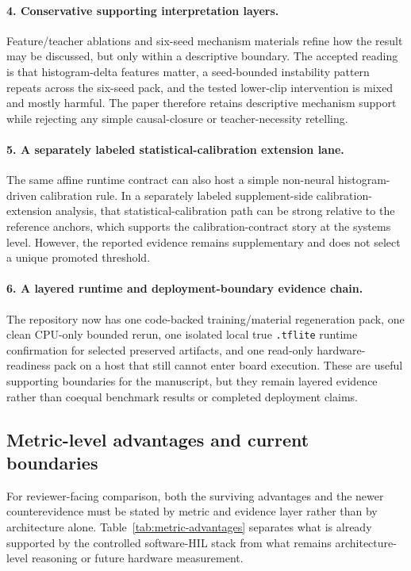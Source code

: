 \documentclass[11pt]{article}
\begin{document}
\paragraph{4. Conservative supporting interpretation layers.}
Feature/teacher ablations and six-seed mechanism materials refine how the
result may be discussed, but only within a descriptive boundary.  The accepted
reading is that histogram-delta features matter, a seed-bounded instability
pattern repeats across the six-seed pack, and the tested lower-clip
intervention is mixed and mostly harmful.  The paper therefore retains
descriptive mechanism support while rejecting any simple causal-closure or
teacher-necessity retelling.

\paragraph{5. A separately labeled statistical-calibration extension lane.}
The same affine runtime contract can also host a simple non-neural
histogram-driven calibration rule.  In a separately labeled supplement-side
calibration-extension analysis, that statistical-calibration path can be strong
relative to the reference anchors, which supports the calibration-contract story
at the systems level.  However, the reported evidence remains supplementary
and does not select a unique promoted threshold.

\paragraph{6. A layered runtime and deployment-boundary evidence chain.}
The repository now has one code-backed training/material regeneration pack,
one clean CPU-only bounded rerun, one isolated local true
\texttt{.tflite} runtime confirmation for selected preserved artifacts, and one
read-only hardware-readiness pack on a host that still cannot enter board
execution.  These are useful supporting boundaries for the
manuscript, but they remain layered evidence rather than coequal benchmark
results or completed deployment claims.

\subsection{Metric-level advantages and current boundaries}

For reviewer-facing comparison, both the surviving advantages and the newer
counterevidence must be stated by metric and evidence layer rather than by
architecture alone.
Table~\ref{tab:metric-advantages} separates what is already supported by the
controlled software-HIL stack from what remains architecture-level reasoning or
future hardware measurement.
\end{document}
